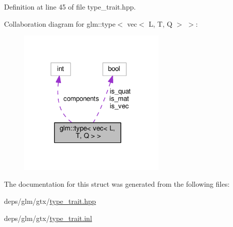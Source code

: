Definition at line 45 of file type\+\_\+trait.\+hpp.



Collaboration diagram for glm\+:\+:type$<$ vec$<$ L, T, Q $>$ $>$\+:
\nopagebreak
\begin{figure}[H]
\begin{center}
\leavevmode
\includegraphics[width=200pt]{da/d15/structglm_1_1type_3_01vec_3_01L_00_01T_00_01Q_01_4_01_4__coll__graph}
\end{center}
\end{figure}


The documentation for this struct was generated from the following files\+:\begin{DoxyCompactItemize}
\item 
deps/glm/gtx/\hyperlink{type__trait_8hpp}{type\+\_\+trait.\+hpp}\item 
deps/glm/gtx/\hyperlink{type__trait_8inl}{type\+\_\+trait.\+inl}\end{DoxyCompactItemize}
